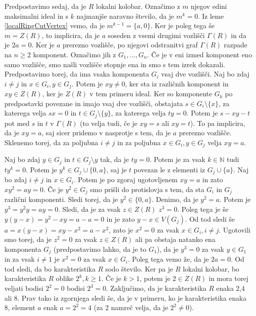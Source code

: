 \documentclass[a4paper, 12pt]{amsart}
\theoremstyle{definition} %
\theoremstyle{plain} %
\newcommand{\N}{\mathbb N}
\begin{document}
Predpostavimo sedaj, da je $R$ lokalni kolobar. Označimo z $m$ njegov edini maksimalni ideal in s $k$ najmanjše naravno število, da je $m^k = 0$. Iz leme \ref{localRingCutVertex} vemo, da je $m^{k-1} =  \{a,0\}$. Ker je poleg tega še $m = Z(R)$, to implicira, da je $a$ soseden z vsemi drugimi vozlišči $\Gamma(R)$ in da je $2a = 0$. Ker je $a$ prerezno vozlišče, po njegovi odstranitvi graf $\Gamma(R)$ razpade na $n\ge 2$ komponent. Označimo jih z $G_1,\dots, G_n$. Če je v eni izmed komponent eno samo vozlišče, smo našli vozlišče stopnje ena in smo s tem izrek dokazali. Predpostavimo torej, da ima vsaka komponenta $G_i$ vsaj dve vozlišči. Naj bo zdaj $i\neq j$ in $x\in G_i, y\in G_j$. Potem je $xy \neq 0$, ker sta iz različnih komponent in $xy \in Z(R)$, ker je $Z(R)$ v tem primeru ideal. Ker so komponente $G_k$ po predpostavki povezane in imajo vsaj dve vozlišči, obstajata $s\in G_i\setminus\{x\}$,  za katerega velja $sx = 0$ in $t\in G_j \setminus \{y\}$, za katerega velja $ty = 0$. Potem je $s-xy -t$ pot med $s$ in $t$ v $\Gamma(R)$ (to velja tudi, če je $xy = s$ ali $xy = t$). To pa implicira, da je $xy = a$, saj sicer pridemo v nasprotje s tem, da je $a$ prerezno vozlišče. Sklenemo torej, da za poljubna $i\neq j$ in za poljubna $x\in G_i, y\in G_j$ velja $xy = a$.

Naj bo zdaj $y\in G_j$ in $t\in G_j\setminus{y}$ tak, da je $ty=0$. Potem je za vsak $k\in \N$ tudi $ty^k = 0$. Potem je $y^k \in G_j \cup\{0,a\}$, saj je $t$ povezan le z elementi iz $G_j \cup \{a\}$. Naj bo zdaj $i \neq j  $ in $x\in G_i$. Potem je po zgoraj ugotovljenem $xy=a$ in zato $xy^2 = ay = 0$. Če je $y^2 \in G_j$ smo prišli do protislovja s tem, da sta $G_i $ in $G_j$ različni komponenti. Sledi torej, da je $y^2  \in \{0,a\}$. Denimo, da je $y^2 = a$. Potem je $y^3 = y^2 y = ay = 0$. Sledi, da je za vsak $z\in Z(R)$ $z^3 = 0$. Poleg tega je še $y(y-x) = y^2 - xy = a -a = 0$ in je zato $y-x \in V(G_j)$. Od tod sledi še $a = x(y-x) = xy - x^2 = a - x^2$, zato je $x^2 = 0$ za vsak $x\in G_i, i\neq j$. Ugotovili smo torej, da je $z^2 = 0$ za vsak $z\in Z(R)$ ali pa obstaja natanko ena komponenta $G_j$ (predpostavimo lahko, da je to $G_1$), da je $y^3 = 0$ za vsak $y\in G_1$ in za vsak $i\neq 1$ je $x^2 = 0$ za vsak $x\in G_i$. Poleg tega vemo že, da je $2a = 0$. Od tod sledi, da bo karakteristika $R$ sodo število. Ker pa je $R$ lokalni kolobar, bo karakteristika  $R$ oblike $2^k, k \ge 1$. Če je $k > 1$, potem je $2\in Z(R)$ in mora torej veljati bodisi $2^2 = 0$ bodisi $2^3 = 0$. Zaključimo, da je karakteristika $R$ enaka 2,4 ali 8. Prav tako iz zgornjega sledi še, da je v primeru, ko je karakteristika enaka 8, element $a$ enak $a = 2^2 = 4$ (za 2 namreč velja, da je $2^2 \neq 0$).
\end{document}
